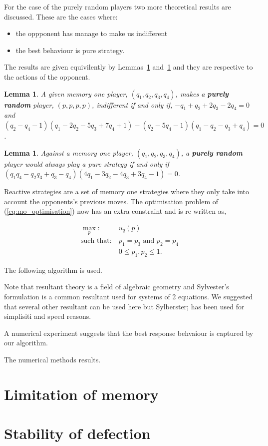 \documentclass[10pt]{article}
\newtheorem{lemma}[theorem]{Lemma}
\begin{document}
For the case of the purely random players two more theoretical results are discussed.
These are the cases where:

\begin{itemize}
    \item the oppponent has manage to make us indifferent
    \item the best behaviour is pure strategy.
\end{itemize}

The results are given equivilently by Lemmas~\ref{lemma:constant} and~\ref{lemma:linear}
and they are respective to the actions of the opponent.

\begin{lemma}\label{lemma:constant}
    A given memory one player, \((q_1, q_2, q_3, q_4)\), makes a \textbf{purely
    random} player, \((p, p, p, p)\), indifferent if and only if, 
    \(-q_1 + q_2 + 2q_3 - 2q_4 = 0 \) and 
    \((q_2 - q_4 - 1)(q_1 - 2q_2 - 5q_3 + 7q_4 + 1) -(q_2 - 5q_4 - 1)(q_1 - q_2 - q_3 + q_4) = 0 \).
\end{lemma}

\begin{lemma}\label{lemma:linear}
    Against a memory one player, \((q_1, q_2, q_3, q_4)\), a \textbf{purely random}
    player would always play a pure strategy if and only if
    \((q_{1}q_{4} - q_{2} q_{3} + q_{3} - q_{4}) (4 q_{1} - 3 q_{2} - 4 q_{3} + 3 
    q_{4} - 1) = 0\).
\end{lemma}

Reactive strategies are a set of memory one strategies where they only take into
account the opponents's previous moves. The optimisation problem of (\ref{eq:mo_optimisation})
now has an extra constraint and is re written as,

\begin{equation}\label{eq:random_optimisation}
\begin{aligned}
\max_p: & \ u_q(p)
\\
\text{such that}: & \ p_1 = p_3 \text{ and } p_2 = p_4\\
    & \ 0 \leq p_1, p_2 \leq 1.
\end{aligned}
\end{equation}

The following algorithm is used.

Note that resultant theory is a field of algebraic geometry and Sylvester's formulation
is a common resultant used for systems of 2 equations.
We suggested that several other resultant can be used here but Sylberster; has been used for simplisiti and 
speed reasons.

A numerical experiment suggests that the best response behvaiour is captured by our algorithm.

The numerical methods
results.

\section{Limitation of memory}

\section{Stability of defection}



\end{document}
